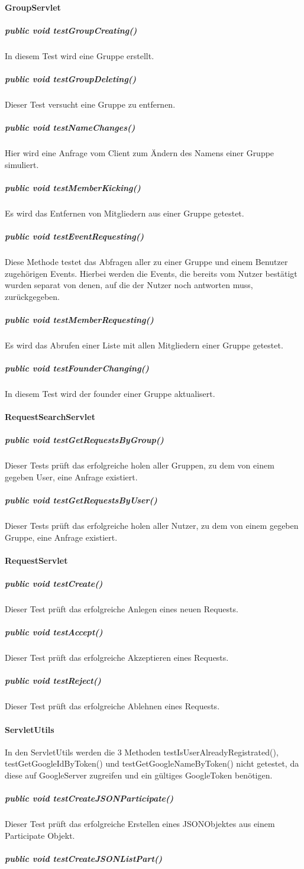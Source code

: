 \documentclass{scrartcl}
\begin{document}
	\paragraph{GroupServlet}
	\subparagraph{public void testGroupCreating()}
	In diesem Test wird eine Gruppe erstellt.
	\subparagraph{public void testGroupDeleting()}
	Dieser Test versucht eine Gruppe zu entfernen.
	\subparagraph{public void testNameChanges()}
	Hier wird eine Anfrage vom Client zum Ändern des Namens einer Gruppe simuliert.
	\subparagraph{public void testMemberKicking()}
	Es wird das Entfernen von Mitgliedern aus einer Gruppe getestet.
	\subparagraph{public void testEventRequesting()}
	Diese Methode testet das Abfragen aller zu einer Gruppe und einem Benutzer zugehörigen Events. Hierbei werden die Events, die bereits vom Nutzer bestätigt wurden separat von denen, auf die der Nutzer noch antworten muss, zurückgegeben.
	\subparagraph{public void testMemberRequesting()}
	Es wird das Abrufen einer Liste mit allen Mitgliedern einer Gruppe getestet.
	\subparagraph{public void testFounderChanging()}
	In diesem Test wird der founder einer Gruppe aktualisert.
	\paragraph{RequestSearchServlet}
	\subparagraph{public void testGetRequestsByGroup()}
	Dieser Tests prüft das erfolgreiche holen aller Gruppen, zu dem von einem gegeben User, eine Anfrage existiert.
	\subparagraph{public void testGetRequestsByUser()}
	Dieser Tests prüft das erfolgreiche holen aller Nutzer, zu dem von einem gegeben Gruppe, eine Anfrage existiert.
	\paragraph{RequestServlet}
	\subparagraph{public void testCreate()}
	Dieser Test prüft das erfolgreiche Anlegen eines neuen Requests.
	\subparagraph{public void testAccept()}
	Dieser Test prüft das erfolgreiche Akzeptieren eines Requests.
	\subparagraph{public void testReject()}
	Dieser Test prüft das erfolgreiche Ablehnen eines Requests.
	\paragraph{ServletUtils}
	In den ServletUtils werden die 3 Methoden testIsUserAlreadyRegistrated(), testGetGoogleIdByToken() und testGetGoogleNameByToken() nicht getestet, da diese auf GoogleServer zugreifen und ein gültiges GoogleToken benötigen.
	\subparagraph{public void testCreateJSONParticipate()}
	Dieser Test prüft das erfolgreiche Erstellen eines JSONObjektes aus einem Participate Objekt.
	\subparagraph{public void testCreateJSONListPart()}
	
\end{document}
